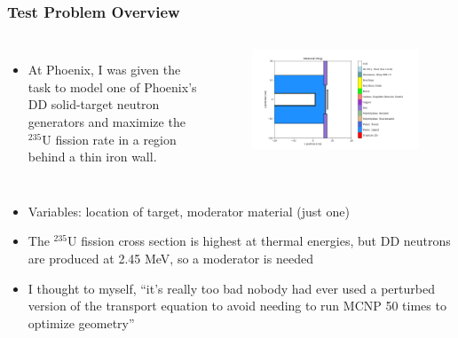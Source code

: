 \documentclass[t]{beamer}
\newcommand{\tildecenter}{\raisebox{0.5ex}{\texttildelow}}
\begin{document}
\begin{frame}
  \frametitle{Test Problem Overview}
  \vskip-0.35in
  \begin{columns}
    \begin{itemize}
      \vskip 0.1in
      \item At Phoenix, I was given the task to model one of Phoenix's DD
            solid-target neutron generators and maximize the ${}^{235}\text{U}$
            fission rate in a region behind a thin iron wall.
    \end{itemize}
    \begin{figure}
      \includegraphics[trim={0.7in 0.2in 0.9in 0.45in},clip,scale=0.36]{images/material_map.png}
    \end{figure}
  \end{columns}
  \begin{itemize}
    \item Variables: location of target, moderator material (just one)
    \item The ${}^{235}\text{U}$ fission cross section is highest at thermal
          energies, but DD neutrons are produced at \tildecenter 2.45 MeV, so a
          moderator is needed
    \item I thought to myself, ``it's really too bad nobody had ever used a
          perturbed version of the transport equation to avoid needing to run
          MCNP 50 times to optimize geometry''
  \end{itemize}
\end{frame}
\end{document}
